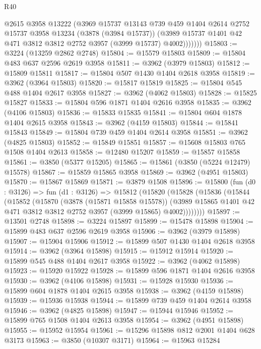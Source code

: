 \begin{lexlean}{R40}
\begin{coremodule}
              @2615
              @3958
              @13222
              (@3969
                @15737
                @13143
                @739
                @459
                @1404
                @2614
                @2752
                @15737
                @3958
                @13234
                (@3878 (@3984 @15737))
                (@3989 @15737 @1401 @42 @471 @3812 @3812 @2752 @3957 (@3999 @15737) @4002)))))))
@15803 := @3224 (@13259 @2862 @2748)
@15804 := @15579 @15803
@15809 := @15804 @483 @637 @2596 @2619 @3958
@15811 := @3962 (@3979 @15803)
@15812 := @15809 @15811
@15817 := @15804 @507 @1430 @1404 @2618 @3958
@15819 := @3962 (@3964 @15803)
@15820 := @15817 @15819
@15825 := @15804 @545 @488 @1404 @2617 @3958
@15827 := @3962 (@4062 @15803)
@15828 := @15825 @15827
@15833 := @15804 @596 @1871 @1404 @2616 @3958
@15835 := @3962 (@4106 @15803)
@15836 := @15833 @15835
@15841 := @15804 @604 @1878 @1404 @2615 @3958
@15843 := @3962 (@4159 @15803)
@15844 := @15841 @15843
@15849 := @15804 @739 @459 @1404 @2614 @3958
@15851 := @3962 (@4825 @15803)
@15852 := @15849 @15851
@15857 := @15608 @15803 @765 @1508 @1404 @2613
@15858 := @12480 @15207
@15859 := @15857 @15858
@15861 := @3850 (@5377 @15205)
@15865 := @15861 (@3850 (@5224 @12479) @15578)
@15867 := @15859 @15865 @3958
@15869 := @3962 (@4951 @15803)
@15870 := @15867 @15869
@15871 := @3879 @1508
@15896 := @15800
    (fun (d0 : @3126) =>
    fun (d1 : @3126) =>
    @15812
      (@15820
        (@15828
          (@15836
            (@15844
              (@15852
                (@15870
                  (@3878 (@15871 @15858 @15578))
                  (@3989 @15865 @1401 @42 @471 @3812 @3812 @2752 @3957 (@3999 @15865) @4002))))))))
@15897 := @13501 @2748
@15898 := @3224 @15897
@15899 := @15478 @15898
@15904 := @15899 @483 @637 @2596 @2619 @3958
@15906 := @3962 (@3979 @15898)
@15907 := @15904 @15906
@15912 := @15899 @507 @1430 @1404 @2618 @3958
@15914 := @3962 (@3964 @15898)
@15915 := @15912 @15914
@15920 := @15899 @545 @488 @1404 @2617 @3958
@15922 := @3962 (@4062 @15898)
@15923 := @15920 @15922
@15928 := @15899 @596 @1871 @1404 @2616 @3958
@15930 := @3962 (@4106 @15898)
@15931 := @15928 @15930
@15936 := @15899 @604 @1878 @1404 @2615 @3958
@15938 := @3962 (@4159 @15898)
@15939 := @15936 @15938
@15944 := @15899 @739 @459 @1404 @2614 @3958
@15946 := @3962 (@4825 @15898)
@15947 := @15944 @15946
@15952 := @15899 @765 @1508 @1404 @2613 @3958
@15954 := @3962 (@4951 @15898)
@15955 := @15952 @15954
@15961 := @15296 @15898 @812 @2001 @1404 @628 @3173
@15963 := @3850 (@10307 @3171)
@15964 := @15963 @15284

\end{coremodule}
\end{lexlean}
